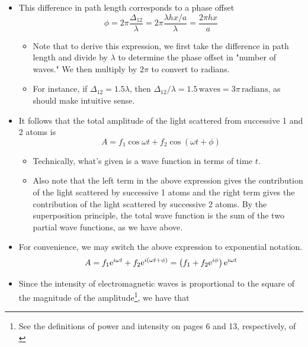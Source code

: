 \documentclass[../notes.tex]{subfiles}
\begin{document}
\begin{itemize}
\begin{itemize}
        \item This difference in path length corresponds to a phase offset
        \begin{equation*}
            \phi = 2\pi\frac{\Delta_{12}}{\lambda}
            = 2\pi\frac{\lambda hx/a}{\lambda}
            = \frac{2\pi hx}{a}
        \end{equation*}
        \begin{itemize}
            \item Note that to derive this expression, we first take the difference in path length and divide by $\lambda$ to determine the phase offset in "number of waves." We then multiply by $2\pi$ to convert to radians.
            \item For instance, if $\Delta_{12}=1.5\lambda$, then $\Delta_{12}/\lambda=1.5\,\text{waves}=3\pi\,\text{radians}$, as should make intuitive sense.
        \end{itemize}
        \item It follows that the total amplitude of the light scattered from successive 1 and 2 atoms is
        \begin{equation*}
            A = f_1\cos\omega t+f_2\cos(\omega t+\phi)
        \end{equation*}
        \begin{itemize}
            \item Technically, what's given is a wave function in terms of time $t$.
            \item Also note that the left term in the above expression gives the contribution of the light scattered by successive 1 atoms and the right term gives the contribution of the light scattered by successive 2 atoms. By the superposition principle, the total wave function is the sum of the two partial wave functions, as we have above.
        \end{itemize}
        \item For convenience, we may switch the above expression to exponential notation.
        \begin{equation*}
            A = f_1\e[i\omega t]+f_2\e[i(\omega t+\phi)]
            = \left( f_1+f_2\e[i\phi] \right)\e[i\omega t]
        \end{equation*}
        \item Since the intensity of electromagnetic waves is proportional to the square of the magnitude of the amplitude\footnote{See the definitions of power and intensity on pages 6 and 13, respectively, of \textcite{bib:PHYS13300Notes}}, we have that

\end{itemize}
\end{itemize}
\end{document}
